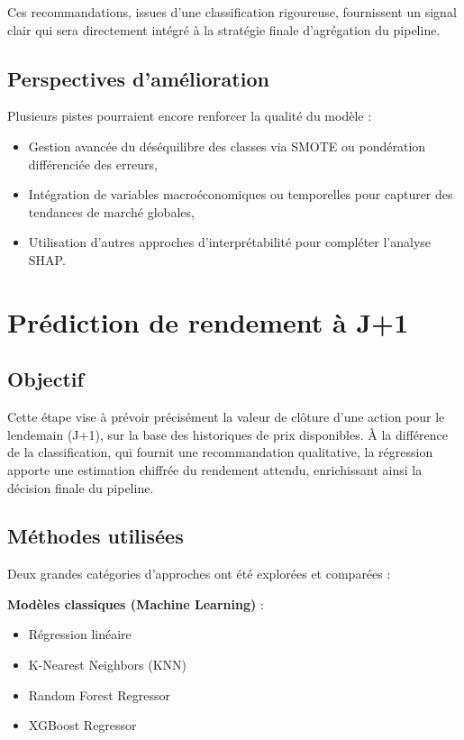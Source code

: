 \documentclass[a4paper,12pt]{article}
\begin{document}
Ces recommandations, issues d'une classification rigoureuse, fournissent un signal clair qui sera directement intégré à la stratégie finale d'agrégation du pipeline.

\subsection*{Perspectives d'amélioration}

Plusieurs pistes pourraient encore renforcer la qualité du modèle :

\begin{itemize}
    \item Gestion avancée du déséquilibre des classes via SMOTE ou pondération différenciée des erreurs,
    \item Intégration de variables macroéconomiques ou temporelles pour capturer des tendances de marché globales,
    \item Utilisation d'autres approches d’interprétabilité pour compléter l’analyse SHAP.
\end{itemize}


\section{Prédiction de rendement à J+1}

\subsection*{Objectif}

Cette étape vise à prévoir précisément la valeur de clôture d'une action pour le lendemain (J+1), sur la base des historiques de prix disponibles. À la différence de la classification, qui fournit une recommandation qualitative, la régression apporte une estimation chiffrée du rendement attendu, enrichissant ainsi la décision finale du pipeline.

\subsection*{Méthodes utilisées}

Deux grandes catégories d'approches ont été explorées et comparées :

\textbf{Modèles classiques (Machine Learning)} :
\begin{itemize}
    \item Régression linéaire
    \item K-Nearest Neighbors (KNN)
    \item Random Forest Regressor
    \item XGBoost Regressor
\end{itemize}
\end{document}
